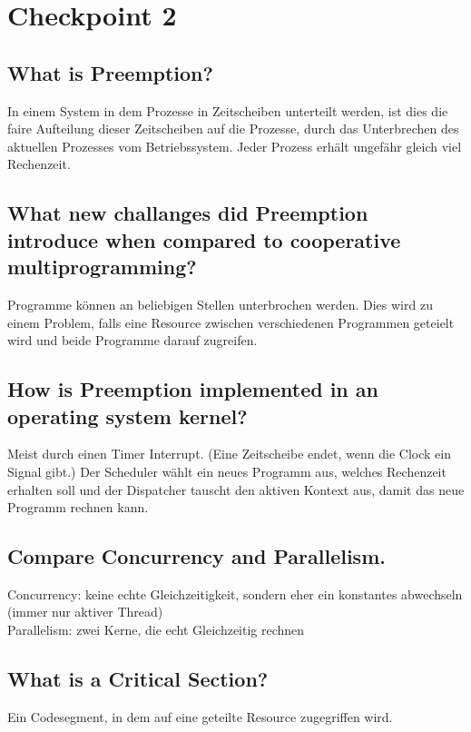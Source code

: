 \section{Checkpoint 2}

\addtocounter{subsection}{1}

\subsection{What is Preemption?}
In einem System in dem Prozesse in Zeitscheiben unterteilt werden, ist dies die faire Aufteilung dieser Zeitscheiben auf die Prozesse, durch das Unterbrechen des aktuellen Prozesses vom Betriebssystem.
Jeder Prozess erhält ungefähr gleich viel Rechenzeit.

\subsection{What new challanges did Preemption introduce when compared to cooperative multiprogramming?}
Programme können an beliebigen Stellen unterbrochen werden.
Dies wird zu einem Problem, falls eine Resource zwischen verschiedenen Programmen geteielt wird und beide Programme darauf zugreifen.

\subsection{How is Preemption implemented in an operating system kernel?}
Meist durch einen Timer Interrupt. (Eine Zeitscheibe endet, wenn die Clock ein Signal gibt.)
Der Scheduler wählt ein neues Programm aus, welches Rechenzeit erhalten soll und der Dispatcher tauscht den aktiven Kontext aus, damit das neue Programm rechnen kann.

\subsection{Compare Concurrency and Parallelism.}
Concurrency: keine echte Gleichzeitigkeit, sondern eher ein konstantes abwechseln (immer nur aktiver Thread)\\
Parallelism: zwei Kerne, die echt Gleichzeitig rechnen

\subsection{What is a Critical Section?}
Ein Codesegment, in dem auf eine geteilte Resource zugegriffen wird.

